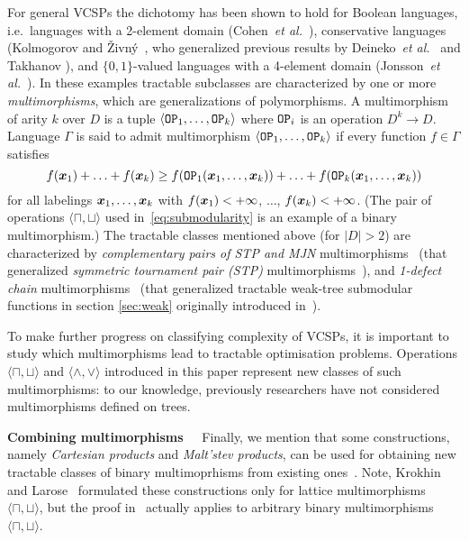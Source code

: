\documentclass[11pt,onecolumn]{article}
\newcommand{\myparagraph}[1]{{\vspace*{2pt}\noindent\bf{#1}~~}}
\def\etal{{\em et al.}}
\newcommand{\bx}{\mbox{\boldmath $x$}}
\begin{document}
For general VCSPs the dichotomy has been shown to hold for Boolean languages, i.e.\ languages with a 2-element domain (Cohen~\etal\ \cite{Cohen:AI06}),
conservative languages (Kolmogorov and \v{Z}ivn\'y~\cite{KZ10:TRa,KZ10:TRb,K10:TRc}, who generalized
previous results by Deineko~\etal~\cite{DeinekoJKK08} and Takhanov \cite{Takhanov10:stacs}),
and $\{0,1\}$-valued languages with a 4-element domain (Jonsson~\etal~\cite{Jonsson:TR11}).
In these examples tractable subclasses are characterized by one or more {\em multimorphisms},
which are generalizations of polymorphisms. A multimorphism of arity $k$ over $D$ is
a tuple $\langle{\tt OP}_1,\ldots,{\tt OP}_k\rangle$ where ${\tt OP}_i$ is an operation $D^k\rightarrow D$.
Language $\Gamma$ is said to admit multimorphism $\langle{\tt OP}_1,\ldots,{\tt OP}_k\rangle$ if every function $f\in\Gamma$ satisfies
$$
f(\bx_1)+\ldots+f(\bx_k)
\ge
f({\tt OP}_1(\bx_1,\ldots,\bx_k))+\ldots+f({\tt OP}_k(\bx_1,\ldots,\bx_k))
$$
for all labelings $\bx_1,\ldots,\bx_k$ with $f(\bx_1)<+\infty$, $\ldots$, $f(\bx_k)<+\infty$.
(The pair of operations $\langle\sqcap,\sqcup\rangle$ used in~\eqref{eq:submodularity} is an example of a binary multimorphism.)
The tractable classes mentioned above (for $|D|>2$) are characterized by 
{\em complementary pairs of STP and MJN} multimorphisms~\cite{KZ10:TRb}
(that generalized {\em symmetric tournament pair (STP)} multimorphisms~\cite{Cohen:TCS08}),
and {\em 1-defect chain} multimorphisms~\cite{Jonsson:TR11}
(that generalized tractable weak-tree submodular functions in section \ref{sec:weak} originally introduced in~\cite{K10:TSv2}).

To make further progress on classifying complexity of VCSPs, it is important to study which
multimorphisms lead to tractable optimisation problems. Operations $\langle\sqcap,\sqcup\rangle$ and $\langle\wedge,\vee\rangle$ introduced in this paper
represent new classes of such multimorphisms: to our knowledge, previously researchers have not considered multimorphisms
defined on trees.

\myparagraph{Combining multimorphisms} Finally, we mention that some constructions, namely {\em Cartesian products} and {\em Malt'stev products},
can be used for obtaining new tractable classes of binary multimoprhisms from existing ones~\cite{KrokhinLarose:08}.
Note, Krokhin and Larose~\cite{KrokhinLarose:08} formulated these constructions only
for lattice multimorphisms $\langle\sqcap,\sqcup\rangle$, but the proof in~\cite{KrokhinLarose:08} actually applies to arbitrary binary multimorphisms $\langle\sqcap,\sqcup\rangle$.
\end{document}
